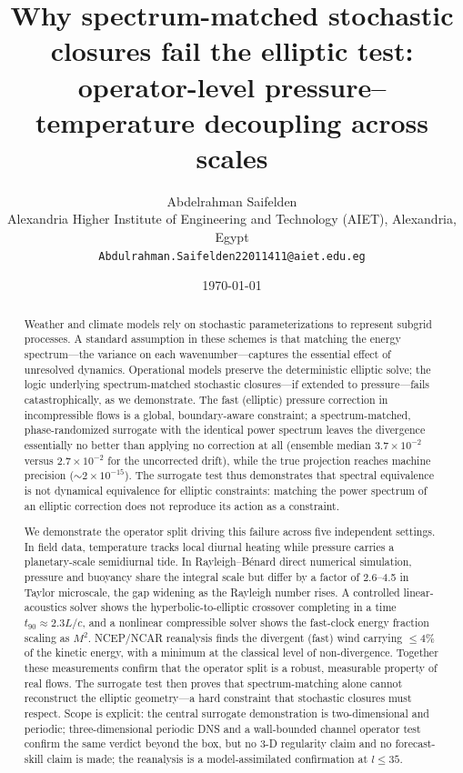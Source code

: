 \documentclass[11pt]{article}
\title{Why spectrum-matched stochastic closures fail the elliptic test: operator-level pressure--temperature decoupling across scales}
\author{Abdelrahman Saifelden\\ Alexandria Higher Institute of Engineering and Technology (AIET), Alexandria, Egypt\\ \texttt{Abdulrahman.Saifelden22011411@aiet.edu.eg}}
\date{\today}
\begin{document}
\maketitle

\begin{abstract}
Weather and climate models rely on stochastic parameterizations to represent subgrid processes. A standard assumption in these schemes is that matching the energy spectrum---the variance on each wavenumber---captures the essential effect of unresolved dynamics. Operational models preserve the deterministic elliptic solve; the logic underlying spectrum-matched stochastic closures---if extended to pressure---fails catastrophically, as we demonstrate. The fast (elliptic) pressure correction in incompressible flows is a global, boundary-aware constraint; a spectrum-matched, phase-randomized surrogate with the identical power spectrum leaves the divergence essentially no better than applying no correction at all (ensemble median $3.7\times10^{-2}$ versus $2.7\times10^{-2}$ for the uncorrected drift), while the true projection reaches machine precision ($\sim2\times10^{-15}$). The surrogate test thus demonstrates that spectral equivalence is not dynamical equivalence for elliptic constraints: matching the power spectrum of an elliptic correction does not reproduce its action as a constraint.

We demonstrate the operator split driving this failure across five independent settings. In field data, temperature tracks local diurnal heating while pressure carries a planetary-scale semidiurnal tide. In Rayleigh--B\'enard direct numerical simulation, pressure and buoyancy share the integral scale but differ by a factor of 2.6--4.5 in Taylor microscale, the gap widening as the Rayleigh number rises. A controlled linear-acoustics solver shows the hyperbolic-to-elliptic crossover completing in a time $t_{90}\approx2.3L/c$, and a nonlinear compressible solver shows the fast-clock energy fraction scaling as $M^{2}$. NCEP/NCAR reanalysis finds the divergent (fast) wind carrying $\leq4\%$ of the kinetic energy, with a minimum at the classical level of non-divergence. Together these measurements confirm that the operator split is a robust, measurable property of real flows. The surrogate test then proves that spectrum-matching alone cannot reconstruct the elliptic geometry---a hard constraint that stochastic closures must respect. Scope is explicit: the central surrogate demonstration is two-dimensional and periodic; three-dimensional periodic DNS and a wall-bounded channel operator test confirm the same verdict beyond the box, but no 3-D regularity claim and no forecast-skill claim is made; the reanalysis is a model-assimilated confirmation at $l \leq 35$.
\end{abstract}
\end{document}
